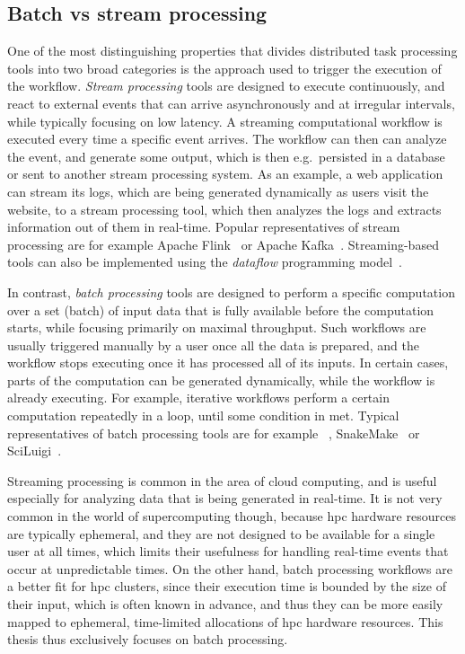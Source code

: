 \subsection{Batch vs stream processing}
One of the most distinguishing properties that divides distributed task processing tools into two
broad categories is the approach used to trigger the execution of the workflow.
\emph{Stream processing} tools are designed to execute continuously, and react to external
events that can arrive asynchronously and at irregular intervals, while typically focusing on low
latency. A streaming computational workflow is executed every time a specific event arrives. The
workflow can then can analyze the event, and generate some output, which is then e.g.\ persisted in
a database or sent to another stream processing system. As an example, a web application can stream
its logs, which are being generated dynamically as users visit the website, to a stream processing
tool, which then analyzes the logs and extracts information out of them in real-time. Popular
representatives of stream processing are for example Apache Flink~\cite{flink} or
Apache Kafka~\cite{kafka}. Streaming-based tools can also be implemented using the
\emph{dataflow} programming model~\cite{dataflow,timely_dataflow}.

In contrast, \emph{batch processing} tools are designed to perform a specific computation over
a set (batch) of input data that is fully available before the computation starts, while focusing
primarily on maximal throughput. Such workflows are usually triggered manually by a user once all
the data is prepared, and the workflow stops executing once it has processed all of its inputs. In
certain cases, parts of the computation can be generated dynamically, while the workflow is already
executing. For example, iterative workflows perform a certain computation repeatedly in a loop,
until some condition in met. Typical representatives of batch processing tools are for example
\dask{}~\cite{dask}, SnakeMake~\cite{snakemake} or
SciLuigi~\cite{sciluigi}.

Streaming processing is common in the area of cloud computing, and is useful especially for
analyzing data that is being generated in real-time. It is not very common in the world of
supercomputing though, because \gls{hpc} hardware resources are typically
ephemeral, and they are not designed to be available for a single user at all times, which limits
their usefulness for handling real-time events that occur at unpredictable times. On the other
hand, batch processing workflows are a better fit for \gls{hpc} clusters, since
their execution time is bounded by the size of their input, which is often known in advance, and
thus they can be more easily mapped to ephemeral, time-limited allocations of
\gls{hpc} hardware resources. This thesis thus exclusively focuses on batch
processing.

